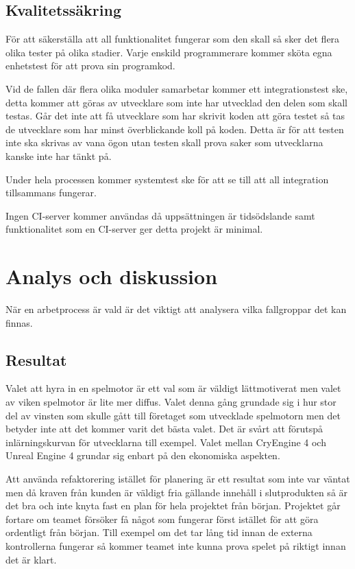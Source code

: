 \documentclass[a4paper,12pt,oneside,final]{extbook}
\begin{document}
\section{Kvalitetssäkring}
För att säkerställa att all funktionalitet fungerar som den skall så sker det flera olika tester på olika stadier. Varje enskild programmerare kommer sköta egna enhetstest för att prova sin programkod. 

Vid de fallen där flera olika moduler samarbetar kommer ett integrationstest ske, detta kommer att göras av utvecklare som inte har utvecklad den delen som skall testas. Går det inte att få utvecklare som har skrivit koden att göra testet så tas de utvecklare som har minst överblickande koll på koden. Detta är för att testen inte ska skrivas av vana ögon utan testen skall prova saker som utvecklarna kanske inte har tänkt på.

Under hela processen kommer systemtest ske för att se till att all integration tillsammans fungerar.

Ingen CI-server kommer användas då uppsättningen är tidsödslande samt funktionalitet som en CI-server ger detta projekt är minimal.


\chapter{Analys och diskussion}

När en arbetprocess är vald är det viktigt att analysera vilka fallgroppar det kan finnas.


\section{Resultat}
Valet att hyra in en spelmotor är ett val som är väldigt lättmotiverat men valet av viken spelmotor är lite mer diffus. Valet denna gång grundade sig i hur stor del av vinsten som skulle gått till företaget som utvecklade spelmotorn men det betyder inte att det kommer varit det bästa valet. Det är svårt att förutspå inlärningskurvan för utvecklarna till exempel. Valet mellan CryEngine 4 och Unreal Engine 4 grundar sig enbart på den ekonomiska aspekten.

Att använda refaktorering istället för planering är ett resultat som inte var väntat men då kraven från kunden är väldigt fria gällande innehåll i slutprodukten så är det bra och inte knyta fast en plan för hela projektet från början. Projektet går fortare om teamet försöker få något som fungerar först istället för att göra ordentligt från början. Till exempel om det tar lång tid innan de externa kontrollerna fungerar så kommer teamet inte kunna prova spelet på riktigt innan det är klart.
\end{document}
